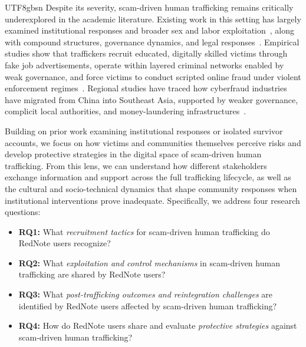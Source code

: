 \documentclass[sigconf,nonacm]{acmart}
\newcommand{\rev}[1]{#1}
\begin{document}
\begin{CJK}{UTF8}{gbsn}
Despite its severity, scam-driven human trafficking remains critically underexplored in the academic literature. \rev{Existing work in this setting has largely examined institutional responses and broader sex and labor exploitation~\cite{stockl2021human, oram2016prevalence}, along with compound structures, governance dynamics, and legal responses~\cite{jesperson2023trafficking, ohchr2023-online-scam-sea, usip2024mekong}. Empirical studies show that traffickers recruit educated, digitally skilled victims through fake job advertisements, operate within layered criminal networks enabled by weak governance, and force victims to conduct scripted online fraud under violent enforcement regimes~\cite{luong2024understanding, luong2025simple, jesperson2023trafficking, lazarus2025assessing}.} \rev{R}egional studies have traced how cyberfraud industries have migrated from China into Southeast Asia, supported by weaker governance, complicit local authorities, and money-laundering infrastructures~\cite{franceschini2023compound, Loughlin2024, Chen2024}. 

\rev{Building on prior work examining institutional responses or isolated survivor accounts, we focus on} how victims and communities themselves perceive risks and develop protective strategies in the digital space of scam-driven human trafficking.
\rev{From this lens, we can understand how different stakeholders exchange information and support across the full trafficking lifecycle, as well as the cultural and socio-technical dynamics that shape community responses when institutional interventions prove inadequate. Specifically, we address four research questions:}

\begin{itemize}
    \item \textbf{RQ1:} What \textit{recruitment tactics} for scam-driven human trafficking do RedNote users recognize?
    \item \textbf{RQ2:} What \textit{exploitation and control mechanisms} in scam-driven human trafficking are shared by RedNote users?
    \item \textbf{RQ3:} What \textit{post-trafficking outcomes and reintegration challenges} are identified by RedNote users affected by scam-driven human trafficking? 
    \item \textbf{RQ4:} How do RedNote users share and evaluate \textit{protective strategies} against scam-driven human trafficking?
\end{itemize}


\end{CJK}
\end{document}
